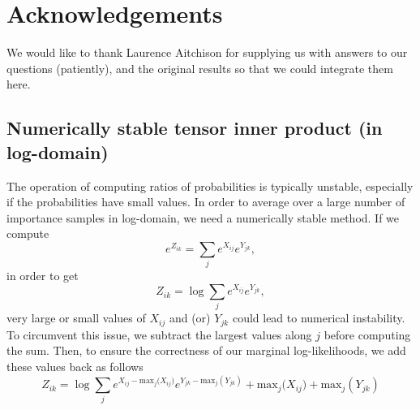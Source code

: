 \documentclass{article}
\begin{document}
\section{Acknowledgements}
We would like to thank Laurence Aitchison for supplying us with answers to our questions (patiently), and the original results so that we could integrate them here. 

 


\begin{appendices}

\section{Numerically stable tensor inner product (in log-domain)}


\label{sec:appendix_tmul}
The operation of computing ratios of probabilities is typically unstable, especially if the probabilities have small values. In order to average over a large number of importance samples in log-domain, we need a numerically stable method. If we compute    
\begin{equation*}
    e^{Z_{ik}} = \sum_j e^{X_{ij}}e^{Y_{jk}},
\end{equation*}
in order to get
\begin{equation*}
    Z_{ik} = \log \sum_j e^{X_{ij}}e^{Y_{jk}},
\end{equation*}
very large or small values of $X_{ij}$ and (or) $Y_{jk}$ could lead to numerical instability. To circumvent this issue, we subtract the largest values along $j$ before computing the sum. Then, to ensure the correctness of our marginal log-likelihoods, we add these values back as follows
\begin{equation*}
    Z_{ik} = \log \sum_j e^{X_{ij} - \text{max}_j({X_{ij})}}e^{Y_{jk} - \text{max}_j(Y_{jk})} + \text{max}_j({X_{ij}) + \text{max}_j}(Y_{jk}) 
\end{equation*}


\end{appendices}
\end{document}
